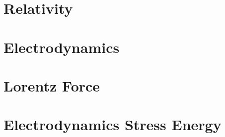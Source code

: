 \part{Relativity}
   
   
   
   
   
   
   
   

\part{Electrodynamics}
   
   
   
   
   
   
   
   
   
   
   
   
   
   
   
   
   
   
   
   
   
   
   

\part{Lorentz Force}
   
   
   
   
   

\part{Electrodynamics Stress Energy}
   
   
   
   
   
   
   
   
   
   
   

